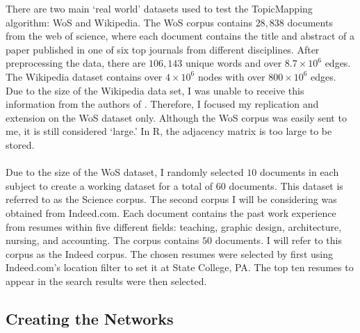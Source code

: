 \documentclass[12pt]{article}
\begin{document}
There are two main `real world' datasets used to test the TopicMapping algorithm:  WoS and Wikipedia. The WoS corpus contains $28,838$ documents from the web of science, where each document contains the title and abstract of a paper published in one of six top journals from different disciplines. After preprocessing the data, there are $106,143$ unique words and over $8.7 \times 10^{6}$ edges. The Wikipedia dataset contains over $4 \times 10^{6}$ nodes with over $800 \times 10^{6}$ edges. Due to the size of the Wikipedia data set, I was unable to receive this information from the authors of \cite{main}. Therefore, I focused my replication and extension on the WoS dataset only. Although the WoS corpus was easily sent to me, it is still considered `large.' In R, the adjacency matrix is too large to be stored. 
\\
\\
Due to the size of the WoS dataset, I randomly selected $10$ documents in each subject to create a working dataset for a total of $60$ documents. This dataset is referred to as the Science corpus. The second corpus I will be considering was obtained from Indeed.com. Each document contains the past work experience from resumes within five different fields: teaching, graphic design, architecture, nursing, and accounting. The corpus contains $50$ documents. I will refer to this corpus as the Indeed corpus. The chosen resumes were selected by first using Indeed.com's location filter to set it at State College, PA. The top ten resumes to appear in the search results were then selected.  

\subsection{Creating the Networks}
\end{document}
